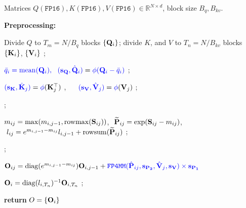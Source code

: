 \begin{algorithm}[ht]
    \small
    \caption{Implementation of the microscaling \texttt{FP4} attention.}
    \label{alg:sage3_fwd} 
    \begin{algorithmic}[1]
     {Matrices $Q(\texttt{FP16}), K(\texttt{FP16}), V(\texttt{FP16}) \in \mathbb{R}^{N \times d}$, block size $B_q, B_{kv}$.}
    

    \STATE \textbf{Preprocessing:}  
    
    \STATE Divide $Q$ to $T_m = {N}/{B_q}$ blocks $\{\mathbf{Q}_i\}$; divide $K$, and $V$ to $T_n = {N}/{B_{kv}}$ blocks $\{\mathbf{K}_i\}$, $\{\mathbf{V}_i\}$ ;  


      \STATE $\textcolor{blue}{{\bar q_i=\mathrm{mean}(\mathbf{Q}_i),~~ (\mathbf{s_Q}, \hat {\mathbf{Q}}_i)}} = \textcolor{blue}{{\phi(\mathbf{Q}_i - \bar q_i)}}$  ;  

            \STATE $\textcolor{blue}{{(\mathbf{s_K}, \hat {\mathbf{K}}_j)}} = \textcolor{blue}{{\phi}}(\mathbf{K}_j^\top)$ , ~~ $\textcolor{blue}{{(\mathbf{s_V}, \hat {\mathbf{V}}_j)}} = \textcolor{blue}{{\phi}}(\mathbf{V}_j)$ ; 

            \STATE {} ;  

            \STATE $m_{ij} = \mathrm{max}(m_{i,j-1}, \mathrm{rowmax}(\mathbf{S}_{ij}))$, $~\widetilde {\mathbf{P}}_{ij} = \mathrm{exp}(\mathbf{S}_{ij} - m_{ij})$, $~l_{ij} = e^{m_{i,j-1}-m_{ij}} l_{i,j-1} + \mathrm{rowsum}(\widetilde {\mathbf{P}}_{ij})$ ;

            \STATE {}; 

            \STATE $\mathbf{O}_{ij} = \mathrm{diag}(e^{m_{i,j-1}-m_{ij}}) \mathbf{O}_{i,j-1} + \textcolor{blue}{{\texttt{FP4MM}(\hat {\mathbf{P}}_{ij}, \mathbf{s_{P_2}}, \hat {\mathbf{V}}_j, \mathbf{s_V}) \times \mathbf{s_{P_1}}}}$
        
        \ENDFOR
        \STATE $\mathbf{O}_i = \mathrm{diag}(l_{i,T_n}) ^{-1} \mathbf{O}_{i,T_n}$ ; %
    \ENDFOR
    
    \STATE \textbf{return} $O = \{\mathbf{O}_i\}$
    \end{algorithmic}
    \vspace{-.2em}
\end{algorithm}







